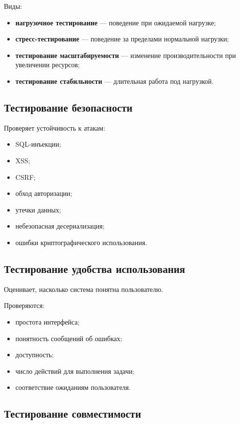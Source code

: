 \documentclass[12pt,a4paper]{article}
\begin{document}
Виды:

\begin{itemize}
    \item \textbf{нагрузочное тестирование} --- поведение при ожидаемой нагрузке;
    \item \textbf{стресс-тестирование} --- поведение за пределами нормальной нагрузки;
    \item \textbf{тестирование масштабируемости} --- изменение производительности при увеличении ресурсов;
    \item \textbf{тестирование стабильности} --- длительная работа под нагрузкой.
\end{itemize}

\subsection{Тестирование безопасности}

Проверяет устойчивость к атакам:

\begin{itemize}
    \item SQL-инъекции;
    \item XSS;
    \item CSRF;
    \item обход авторизации;
    \item утечки данных;
    \item небезопасная десериализация;
    \item ошибки криптографического использования.
\end{itemize}

\subsection{Тестирование удобства использования}

Оценивает, насколько система понятна пользователю.

Проверяются:

\begin{itemize}
    \item простота интерфейса;
    \item понятность сообщений об ошибках;
    \item доступность;
    \item число действий для выполнения задачи;
    \item соответствие ожиданиям пользователя.
\end{itemize}

\subsection{Тестирование совместимости}
\end{document}
